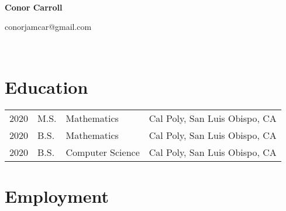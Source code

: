 \documentclass[11pt]{article}
\begin{document}
~
~

\begin{center}
  {
	\fontsize{1.5cm}{1.5cm}
        \textcolor{CalPolyGreen}{\textbf{Conor Carroll}}
  }
  ~

  conorjamcar@gmail.com

\end{center}

~
~


\section*{\textcolor{CalPolyGreen}{Education}}
\begin{tabular}{llll}
        2020    & M.S.  & Mathematics           & Cal Poly, San Luis Obispo, CA \\
        2020    & B.S.  & Mathematics           & Cal Poly, San Luis Obispo, CA \\
        2020    & B.S.  & Computer Science      & Cal Poly, San Luis Obispo, CA \\
\end{tabular}

\section*{\textcolor{CalPolyGreen}{Employment}}
\end{document}

